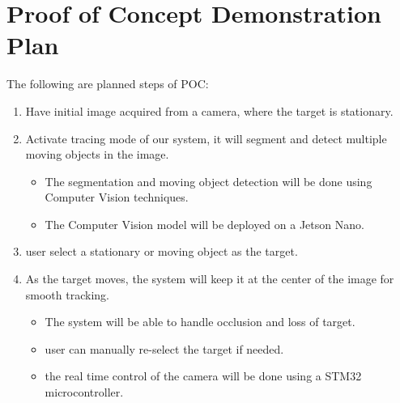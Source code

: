 \documentclass{article}
\begin{document}
\section{Proof of Concept Demonstration Plan}

The following are planned steps of POC:

\begin{enumerate}
  \item Have initial image acquired from a camera, where the target is stationary.
  \item Activate tracing mode of our system, it will segment and detect multiple moving
        objects in the image.
        \begin{itemize}
          \item The segmentation and moving object detection will be done using Computer Vision
                techniques.
          \item The Computer Vision model will be deployed on a Jetson Nano.
        \end{itemize}
  \item user select a stationary or moving object as the target.
  \item As the target moves, the system will keep it at the center of the image for
        smooth tracking.
        \begin{itemize}
          \item The system will be able to handle occlusion and loss of target.
          \item user can manually re-select the target if needed.
          \item the real time control of the camera will be done using a STM32 microcontroller.
        \end{itemize}
\end{enumerate}
\end{document}
